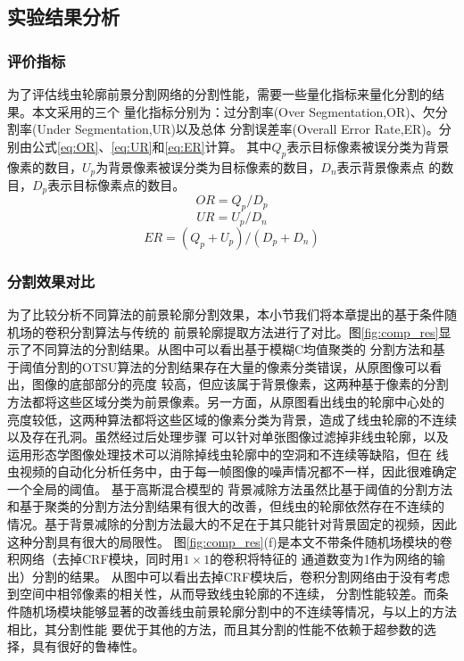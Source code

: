 \subsection{实验结果分析}
\subsubsection{评价指标}
	为了评估线虫轮廓前景分割网络的分割性能，需要一些量化指标来量化分割的结果。本文采用的三个
	量化指标分别为：过分割率(Over Segmentation,OR)、欠分割率(Under Segmentation,UR)以及总体
	分割误差率(Overall Error Rate,ER)\cite{Liu2006Set}。分别由公式\ref{eq:OR}、\ref{eq:UR}和\ref{eq:ER}计算。
	其中$Q_p$表示目标像素被误分类为背景像素的数目，$U_p$为背景像素被误分类为目标像素的数目，$D_n$表示背景像素点
	的数目，$D_p$表示目标像素点的数目。
		\begin{equation}
		OR = Q_p/D_p \label{eq:OR}
		\end{equation}
		\begin{equation}
		UR = U_p/D_n \label{eq:UR}
		\end{equation}
		\begin{equation}
		ER = (Q_p+U_p)/(D_p+D_n)\label{eq:ER}
		\end{equation}
\subsubsection{分割效果对比}
	为了比较分析不同算法的前景轮廓分割效果，本小节我们将本章提出的基于条件随机场的卷积分割算法与传统的
	前景轮廓提取方法进行了对比。图\ref{fig:comp_res}显示了不同算法的分割结果。从图中可以看出基于模糊C均值聚类的
	分割方法和基于阈值分割的OTSU算法的分割结果存在大量的像素分类错误，从原图像可以看出，图像的底部部分的亮度
	较高，但应该属于背景像素，这两种基于像素的分割方法都将这些区域分类为前景像素。另一方面，从原图看出线虫的轮廓中心处的
	亮度较低，这两种算法都将这些区域的像素分类为背景，造成了线虫轮廓的不连续以及存在孔洞。虽然经过后处理步骤
	可以针对单张图像过滤掉非线虫轮廓，以及运用形态学图像处理技术可以消除掉线虫轮廓中的空洞和不连续等缺陷，但在
	线虫视频的自动化分析任务中，由于每一帧图像的噪声情况都不一样，因此很难确定一个全局的阈值。 基于高斯混合模型的
	背景减除方法虽然比基于阈值的分割方法和基于聚类的分割方法分割结果有很大的改善，但线虫的轮廓依然存在不连续的
	情况。基于背景减除的分割方法最大的不足在于其只能针对背景固定的视频，因此这种分割具有很大的局限性。
	图\ref{fig:comp_res}(f)是本文不带条件随机场模块的卷积网络（去掉CRF模块，同时用$1\times1$的卷积将特征的
	通道数变为1作为网络的输出）分割的结果。
	从图中可以看出去掉CRF模块后，卷积分割网络由于没有考虑到空间中相邻像素的相关性，从而导致线虫轮廓的不连续，
	分割性能较差。而条件随机场模块能够显著的改善线虫前景轮廓分割中的不连续等情况，与以上的方法相比，其分割性能
	要优于其他的方法，而且其分割的性能不依赖于超参数的选择，具有很好的鲁棒性。
	
